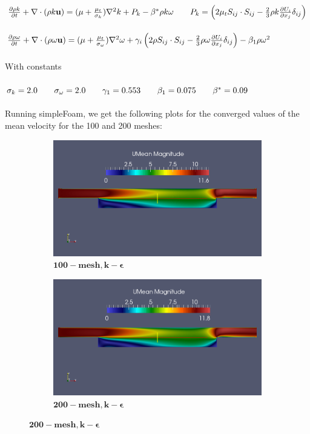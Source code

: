 \documentclass[a4paper,english,12pt,twoside]{article}
\newcommand{\tab}{\hspace*{2em}}
\begin{document}
$\pdi{\rho k}{t} + \nabla\cdot(\rho k \vec{u}) = (\mu + \frac{\mu_t}{\sigma_k})\nabla^2k + P_k - \beta^*\rho k\omega\tab P_k = \left(2\mu_t S_{ij}\cdot S_{ij} - \frac{2}{3}\rho k\pdi{U_i}{x_j}\delta_{ij}\right)$\\
\\
$\frac{\partial \rho \omega}{\partial t} + \nabla\cdot(\rho \omega \mathbf{u}) = (\mu + \frac{\mu_t}{\sigma_{\omega}})\nabla^2\omega + \gamma_i\left(2\rho S_{ij}\cdot S_{ij} - \frac{2}{3}\rho \omega\frac{\partial U_i}{\partial x_j}\delta_{ij}\right) - \beta_1\rho\omega^2$\\
\\
With constants\\
\\
$\sigma_k = 2.0\tab\sigma_{\omega} = 2.0\tab\gamma_1 = 0.553\tab\beta_1 = 0.075\tab\beta^* = 0.09$\\
\\
Running simpleFoam, we get the following plots for the converged values of the mean velocity for the 100 and 200 meshes:\\
\begin{figure}[h!]
	\begin{subfigure}{0.5\textwidth}
		\includegraphics[width=0.95\linewidth]{simple_ko_10_mean_u.png}
		\caption{$\mathbf{ 100-mesh, k-\epsilon}$}
	\end{subfigure}
	\begin{subfigure}{0.5\textwidth}
		\includegraphics[width=0.95\linewidth]{simple_ko_20_mean_u.png}
		\caption{$\mathbf{ 200-mesh, k-\epsilon}$}
	\end{subfigure}
\end{figure}
\end{document}
